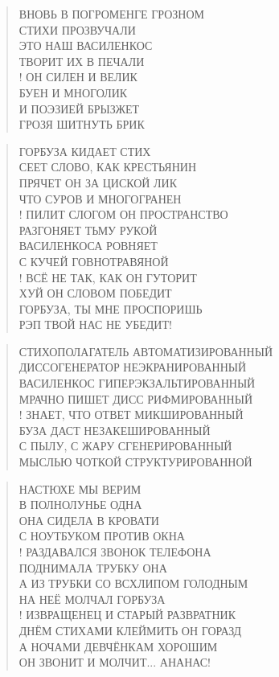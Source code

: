 \poemtitle{***}
\begin{verse}
ВНОВЬ В ПОГРОМЕНГЕ ГРОЗНОМ\\
СТИХИ ПРОЗВУЧАЛИ\\
ЭТО НАШ ВАСИЛЕНКОС\\
ТВОРИТ ИХ В ПЕЧАЛИ\\!
ОН СИЛЕН И ВЕЛИК\\
БУЕН И МНОГОЛИК\\
И ПОЭЗИЕЙ БРЫЗЖЕТ\\
ГРОЗЯ ШИТНУТЬ БРИК
\end{verse}

\poemtitle{***}
\begin{verse}
ГОРБУЗА КИДАЕТ СТИХ\\
СЕЕТ СЛОВО, КАК КРЕСТЬЯНИН\\
ПРЯЧЕТ ОН ЗА ЦИСКОЙ ЛИК\\
ЧТО СУРОВ И МНОГОГРАНЕН\\!
ПИЛИТ СЛОГОМ ОН ПРОСТРАНСТВО\\
РАЗГОНЯЕТ ТЬМУ РУКОЙ\\
ВАСИЛЕНКОСА РОВНЯЕТ\\
С КУЧЕЙ ГОВНОТРАВЯНОЙ\\!
ВСЁ НЕ ТАК, КАК ОН ГУТОРИТ\\
ХУЙ ОН СЛОВОМ ПОБЕДИТ\\
ГОРБУЗА, ТЫ МНЕ ПРОСПОРИШЬ\\
РЭП ТВОЙ НАС НЕ УБЕДИТ!
\end{verse}

\poemtitle{***}
\begin{verse}
СТИХОПОЛАГАТЕЛЬ АВТОМАТИЗИРОВАННЫЙ\\
ДИССОГЕНЕРАТОР НЕЭКРАНИРОВАННЫЙ\\
ВАСИЛЕНКОС ГИПЕРЭКЗАЛЬТИРОВАННЫЙ\\
МРАЧНО ПИШЕТ ДИСС РИФМИРОВАННЫЙ\\!
ЗНАЕТ, ЧТО ОТВЕТ МИКШИРОВАННЫЙ\\
БУЗА ДАСТ НЕЗАКЕШИРОВАННЫЙ\\
С ПЫЛУ, С ЖАРУ СГЕНЕРИРОВАННЫЙ\\
МЫСЛЬЮ ЧОТКОЙ СТРУКТУРИРОВАННОЙ
\end{verse}

\poemtitle{***}
\begin{verse}
НАСТЮХЕ МЫ ВЕРИМ\\
В ПОЛНОЛУНЬЕ ОДНА \\
ОНА СИДЕЛА В КРОВАТИ\\
С НОУТБУКОМ ПРОТИВ ОКНА\\!
РАЗДАВАЛСЯ ЗВОНОК ТЕЛЕФОНА\\
ПОДНИМАЛА ТРУБКУ ОНА\\
А ИЗ ТРУБКИ СО ВСХЛИПОМ ГОЛОДНЫМ\\
НА НЕЁ МОЛЧАЛ ГОРБУЗА\\!
ИЗВРАЩЕНЕЦ И СТАРЫЙ РАЗВРАТНИК\\
ДНЁМ СТИХАМИ КЛЕЙМИТЬ ОН ГОРАЗД\\
А НОЧАМИ ДЕВЧЁНКАМ ХОРОШИМ\\
ОН ЗВОНИТ И МОЛЧИТ... АНАНАС!
\end{verse}

